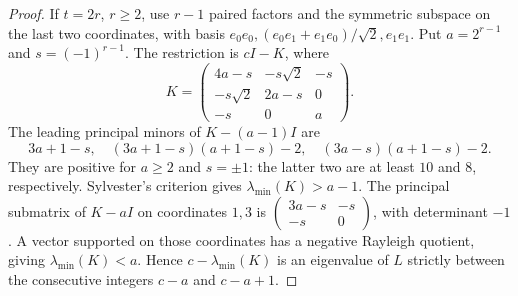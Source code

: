 \begin{proof}
If $t=2r$, $r\geq2$, use $r-1$ paired factors and the symmetric subspace
on the last two coordinates, with basis
$e_0e_0,(e_0e_1+e_1e_0)/\sqrt2,e_1e_1$.
Put $a=2^{r-1}$ and $s=(-1)^{r-1}$. The restriction is $cI-K$, where
\[
K=\begin{pmatrix}
4a-s&-s\sqrt2&-s\\-s\sqrt2&2a-s&0\\-s&0&a
\end{pmatrix}.
\]
The leading principal minors of $K-(a-1)I$ are
\[
3a+1-s,\quad(3a+1-s)(a+1-s)-2,\quad(3a-s)(a+1-s)-2.
\]
They are positive for $a\geq2$ and $s=\pm1$: the latter two are at
least $10$ and $8$, respectively. Sylvester's criterion gives
$\lambda_{\min}(K)>a-1$.
The principal submatrix of $K-aI$ on coordinates $1,3$ is
$\left(\begin{smallmatrix}3a-s&-s\\-s&0\end{smallmatrix}\right)$,
with determinant $-1$. A vector supported on those coordinates has a
negative Rayleigh quotient, giving $\lambda_{\min}(K)<a$.
Hence $c-\lambda_{\min}(K)$ is an eigenvalue of $L$ strictly between
the consecutive integers $c-a$ and $c-a+1$.
\end{proof}
